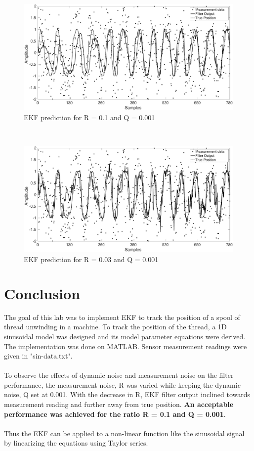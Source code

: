 \documentclass[12pt]{article}
\begin{document}
\begin{figure}[ht!]
\centering
	\includegraphics[width = \textwidth]{./Figures/ratio2.eps}
	\caption{EKF prediction for R = 0.1 and Q = 0.001}
	\label{fig:EKF rat2}
\end{figure} 
\quad \\
\begin{figure}[hb!]
\centering
	\includegraphics[width = \textwidth]{./Figures/ratio3.eps}
	\caption{EKF prediction for R = 0.03 and Q = 0.001}
	\label{fig:EKF rat3}
\end{figure} \newpage

\newpage
\section{Conclusion}
The goal of this lab was to implement EKF to track the position of a spool of thread unwinding in a machine. To track the position of the thread, a 1D sinusoidal model was designed and its model parameter equations were derived. The implementation was done on MATLAB. Sensor measurement readings were given in "sin-data.txt". \\
\\
To observe the effects of dynamic noise and measurement noise on the filter performance, the measurement noise, R was varied while keeping the dynamic noise, Q set at 0.001. With the decrease in R, EKF filter output inclined towards measurement reading and further away from true position.\textbf{ An acceptable performance was achieved for the ratio R = 0.1 and Q = 0.001}. \\
\\
Thus the EKF can be applied to a non-linear function like the sinusoidal signal by linearizing the equations using Taylor series.
\end{document}

